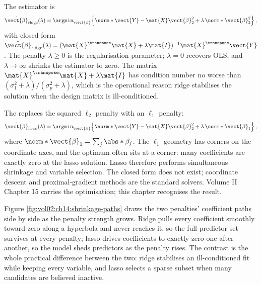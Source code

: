 The  estimator is
\[
\hat{\vect{\beta}}_{\mathrm{ridge}}(\lambda)
 = \argmin_{\vect{\beta}}\!\left\{
   \norm*{\vect{Y} - \mat{X}\vect{\beta}}_{2}^{2}
 + \lambda\, \norm*{\vect{\beta}}_{2}^{2}\right\},
\]
with closed form $\hat{\vect{\beta}}_{\mathrm{ridge}}(\lambda) =
(\mat{X}^{\transpose}\mat{X} + \lambda \mat{I})^{-1}
\mat{X}^{\transpose}\vect{Y}$. The penalty $\lambda \geq 0$ is the
regularisation parameter; $\lambda = 0$ recovers OLS, and $\lambda
\to \infty$ shrinks the estimator to zero. The matrix
$\mat{X}^{\transpose}\mat{X} + \lambda\mat{I}$ has condition number
no worse than $(\sigma_{1}^{2} + \lambda)/(\sigma_{p}^{2} +
\lambda)$, which is the operational reason ridge stabilises the
solution when the design matrix is ill-conditioned.

The  replaces the squared $\ell_{2}$ penalty with an
$\ell_{1}$ penalty:
\[
\hat{\vect{\beta}}_{\mathrm{lasso}}(\lambda)
 = \argmin_{\vect{\beta}}\!\left\{
   \norm*{\vect{Y} - \mat{X}\vect{\beta}}_{2}^{2}
 + \lambda\, \norm*{\vect{\beta}}_{1}\right\},
\]
where $\norm*{\vect{\beta}}_{1} = \sum_{j} \abs*{\beta_{j}}$. The
$\ell_{1}$ geometry has corners on the coordinate axes, and the
optimum often sits at a corner: many coefficients are exactly zero
at the lasso solution. Lasso therefore performs simultaneous
shrinkage and variable selection. The closed form does not exist;
coordinate descent and proximal-gradient methods are the standard
solvers. Volume II Chapter 15 carries the optimisation; this chapter
recognises the result.

Figure \ref{fig:vol02:ch14:shrinkage-paths} draws the two penalties'
coefficient paths side by side as the penalty strength grows. Ridge
pulls every coefficient smoothly toward zero along a hyperbola and
never reaches it, so the full predictor set survives at every penalty;
lasso drives coefficients to exactly zero one after another, so the
model sheds predictors as the penalty rises. The contrast is the whole
practical difference between the two: ridge stabilises an
ill-conditioned fit while keeping every variable, and lasso selects a
sparse subset when many candidates are believed inactive.



